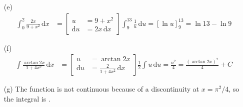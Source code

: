 \documentclass[preview, margin=0.6in]{standalone}
\begin{document}
\begin{itemize}
	\item[(e)]
	\begin{align*}
		\int_{0}^{2}\frac{2x}{9+x^2}\,\mathrm{d}x
		&=\left[ \begin{aligned}
			u&=9+x^2 \\
			\mathrm{d}u&=2x \,\mathrm{d}x
		\end{aligned} \right]
		\int_{9}^{13}\frac{1}{u}\,\mathrm{d}u
		=\left[\ln u\right]_{9}^{13}
		=\boxed{\ln13-\ln9}
	\end{align*}

	\item[(f)]
	\begin{align*}
		\int \frac{\arctan2x}{1+4x^2}\,\mathrm{d}x
		&=\left[ \begin{aligned}
			u&=\arctan 2x \\
			\mathrm{d}u&=\frac{2}{1+4x^2}\,\mathrm{d}x
		\end{aligned} \right]
		\frac12\int u\,\mathrm{d}u
		=\frac{u^2}{4}
		=\boxed{\frac{\left(\arctan2x\right)^2}{4}+C}
	\end{align*}

	\item[(g)] The function is not continuous because of a discontinuity at $x=\pi^2/4$, so the integral is .
\end{itemize}
\end{document}
